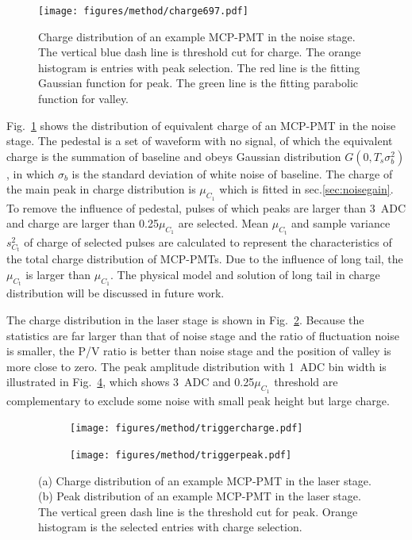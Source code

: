 \begin{figure}[!htbp]
    \centering
    \texttt{[image: figures/method/charge697.pdf]}
    \caption{Charge distribution of an example MCP-PMT in the noise stage. The vertical blue dash line is threshold cut for charge. The orange histogram is entries with peak selection. The red line is the fitting Gaussian function for peak. The green line is the fitting parabolic function for valley.}
    \label{fig:charge}
\end{figure}

Fig.~\ref{fig:charge} shows the distribution of equivalent charge of an MCP-PMT in the noise stage. The pedestal is a set of waveform with no signal, of which the equivalent charge is the summation of baseline and obeys Gaussian distribution $G(0, T_s\sigma_b^2)$, in which $\sigma_b$ is the standard deviation of white noise of baseline. The charge of the main peak in charge distribution is $\mu_{C_1}$ which is fitted in sec.\ref{sec:noisegain}. To remove the influence of pedestal, pulses of which peaks are larger than \SI{3}{ADC} and charge are larger than 0.25$\mu_{C_1}$ are selected. Mean $\mu_{C_{\mathrm{t}}}$ and sample variance $s^2_{C_{\mathrm{t}}}$ of charge of selected pulses are calculated to represent the characteristics of the total charge distribution of MCP-PMTs. Due to the influence of long tail, the $\mu_{C_{\mathrm{t}}}$ is larger than $\mu_{C_1}$. The physical model and solution of long tail in charge distribution will be discussed in future work.

The charge distribution in the laser stage is shown in Fig.~\ref{fig:triggercharge}. Because the statistics are far larger than that of noise stage and the ratio of fluctuation noise is smaller, the P/V ratio is better than noise stage and the position of valley is more close to zero. The peak amplitude distribution with \SI{1}{ADC} bin width is illustrated in Fig.~\ref{fig:triggerpeak}, which shows \SI{3}{ADC} and 0.25$\mu_{C_1}$ threshold are complementary to exclude some noise with small peak height but large charge.

\begin{figure}[!htbp]
    \centering
    \begin{subfigure}[b]{0.4\textwidth}
        \texttt{[image: figures/method/triggercharge.pdf]}
        \caption{}%
        \label{fig:triggercharge}
    \end{subfigure}
    \begin{subfigure}[b]{0.4\textwidth}
        \texttt{[image: figures/method/triggerpeak.pdf]}
        \caption{}%
        \label{fig:triggerpeak}
    \end{subfigure}
    \caption{(a) Charge distribution of an example MCP-PMT in the laser stage. (b) Peak distribution of an example MCP-PMT in the laser stage. The vertical green dash line is the threshold cut for peak. Orange histogram is the selected entries with charge selection.}
\end{figure}

